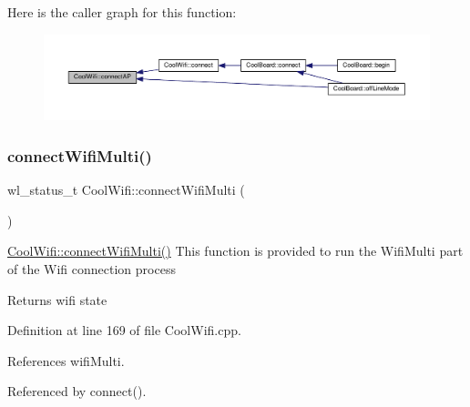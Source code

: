Here is the caller graph for this function\+:
\nopagebreak
\begin{figure}[H]
\begin{center}
\leavevmode
\includegraphics[width=350pt]{classCoolWifi_a7c857f27161782f5ef1d62d552aff971_icgraph}
\end{center}
\end{figure}
\mbox{\label{classCoolWifi_a419de92d738f14b7444cf822b3ab0070}} 
\subsubsection{\texorpdfstring{connect\+Wifi\+Multi()}{connectWifiMulti()}}
{\footnotesize\ttfamily wl\+\_\+status\+\_\+t Cool\+Wifi\+::connect\+Wifi\+Multi (\begin{DoxyParamCaption}{ }\end{DoxyParamCaption})}

\hyperlink{classCoolWifi_a419de92d738f14b7444cf822b3ab0070}{Cool\+Wifi\+::connect\+Wifi\+Multi()} This function is provided to run the Wifi\+Multi part of the Wifi connection process

\begin{DoxyReturn}{Returns}
wifi state 
\end{DoxyReturn}


Definition at line 169 of file Cool\+Wifi.\+cpp.



References wifi\+Multi.



Referenced by connect().


